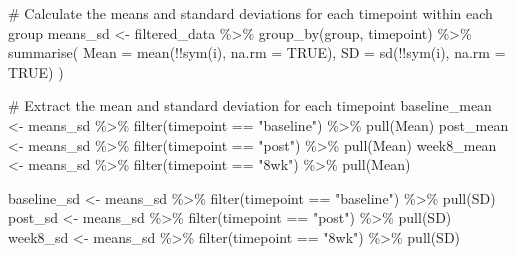\documentclass[
  letterpaper,
  DIV=11,
  numbers=noendperiod]{scrreprt}
\newenvironment{Shaded}{\begin{snugshade}}{\end{snugshade}}
\newcommand{\AttributeTok}[1]{\textcolor[rgb]{0.40,0.45,0.13}{#1}}
\newcommand{\CommentTok}[1]{\textcolor[rgb]{0.37,0.37,0.37}{#1}}
\newcommand{\ConstantTok}[1]{\textcolor[rgb]{0.56,0.35,0.01}{#1}}
\newcommand{\FunctionTok}[1]{\textcolor[rgb]{0.28,0.35,0.67}{#1}}
\newcommand{\NormalTok}[1]{\textcolor[rgb]{0.00,0.23,0.31}{#1}}
\newcommand{\OtherTok}[1]{\textcolor[rgb]{0.00,0.23,0.31}{#1}}
\newcommand{\SpecialCharTok}[1]{\textcolor[rgb]{0.37,0.37,0.37}{#1}}
\newcommand{\StringTok}[1]{\textcolor[rgb]{0.13,0.47,0.30}{#1}}
\begin{document}
\begin{Shaded}
\begin{Highlighting}[]
  \CommentTok{\# Calculate the means and standard deviations for each timepoint within each group}
\NormalTok{  means\_sd }\OtherTok{\textless{}{-}}\NormalTok{ filtered\_data }\SpecialCharTok{\%\textgreater{}\%}
    \FunctionTok{group\_by}\NormalTok{(group, timepoint) }\SpecialCharTok{\%\textgreater{}\%}
    \FunctionTok{summarise}\NormalTok{(}
      \AttributeTok{Mean =} \FunctionTok{mean}\NormalTok{(}\SpecialCharTok{!!}\FunctionTok{sym}\NormalTok{(i), }\AttributeTok{na.rm =} \ConstantTok{TRUE}\NormalTok{),}
      \AttributeTok{SD =} \FunctionTok{sd}\NormalTok{(}\SpecialCharTok{!!}\FunctionTok{sym}\NormalTok{(i), }\AttributeTok{na.rm =} \ConstantTok{TRUE}\NormalTok{)}
\NormalTok{    )}
  
  \CommentTok{\# Extract the mean and standard deviation for each timepoint}
\NormalTok{  baseline\_mean }\OtherTok{\textless{}{-}}\NormalTok{ means\_sd }\SpecialCharTok{\%\textgreater{}\%}
    \FunctionTok{filter}\NormalTok{(timepoint }\SpecialCharTok{==} \StringTok{"baseline"}\NormalTok{) }\SpecialCharTok{\%\textgreater{}\%}
    \FunctionTok{pull}\NormalTok{(Mean)}
\NormalTok{  post\_mean }\OtherTok{\textless{}{-}}\NormalTok{ means\_sd }\SpecialCharTok{\%\textgreater{}\%}
    \FunctionTok{filter}\NormalTok{(timepoint }\SpecialCharTok{==} \StringTok{"post"}\NormalTok{) }\SpecialCharTok{\%\textgreater{}\%}
    \FunctionTok{pull}\NormalTok{(Mean)}
\NormalTok{  week8\_mean }\OtherTok{\textless{}{-}}\NormalTok{ means\_sd }\SpecialCharTok{\%\textgreater{}\%}
    \FunctionTok{filter}\NormalTok{(timepoint }\SpecialCharTok{==} \StringTok{"8wk"}\NormalTok{) }\SpecialCharTok{\%\textgreater{}\%}
    \FunctionTok{pull}\NormalTok{(Mean)}
  
\NormalTok{  baseline\_sd }\OtherTok{\textless{}{-}}\NormalTok{ means\_sd }\SpecialCharTok{\%\textgreater{}\%}
    \FunctionTok{filter}\NormalTok{(timepoint }\SpecialCharTok{==} \StringTok{"baseline"}\NormalTok{) }\SpecialCharTok{\%\textgreater{}\%}
    \FunctionTok{pull}\NormalTok{(SD)}
\NormalTok{  post\_sd }\OtherTok{\textless{}{-}}\NormalTok{ means\_sd }\SpecialCharTok{\%\textgreater{}\%}
    \FunctionTok{filter}\NormalTok{(timepoint }\SpecialCharTok{==} \StringTok{"post"}\NormalTok{) }\SpecialCharTok{\%\textgreater{}\%}
    \FunctionTok{pull}\NormalTok{(SD)}
\NormalTok{  week8\_sd }\OtherTok{\textless{}{-}}\NormalTok{ means\_sd }\SpecialCharTok{\%\textgreater{}\%}
    \FunctionTok{filter}\NormalTok{(timepoint }\SpecialCharTok{==} \StringTok{"8wk"}\NormalTok{) }\SpecialCharTok{\%\textgreater{}\%}
    \FunctionTok{pull}\NormalTok{(SD)}
  

\end{Highlighting}
\end{Shaded}
\end{document}
